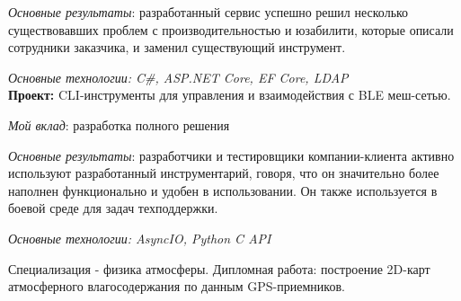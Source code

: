 \documentclass[
	a4paper,
]{fortysecondscv}
\begin{document}
\textit{Основные результаты}: разработанный сервис успешно решил несколько существовавших проблем с производительностью и юзабилити, которые описали сотрудники заказчика, и заменил существующий инструмент.

\textit{Основные технологии: C\#, ASP.NET Core, EF Core, LDAP}
\\[0.5em]
\textbf{Проект:} CLI-инструменты для управления и взаимодействия с BLE меш-сетью.

\textit{Мой вклад}: разработка полного решения

\textit{Основные результаты}: разработчики и тестировщики компании-клиента активно используют разработанный инструментарий, говоря, что он значительно более наполнен функционально и удобен в использовании. Он также используется в боевой среде для задач техподдержки.

\textit{Основные технологии: AsyncIO, Python C API}

\begin{cvtable}[1.5]
		{Специализация - физика атмосферы. Дипломная работа: построение 2D-карт атмосферного влагосодержания по данным GPS-приемников.}
\end{cvtable}


\begin{cvtable}
\end{cvtable}


\end{document}
